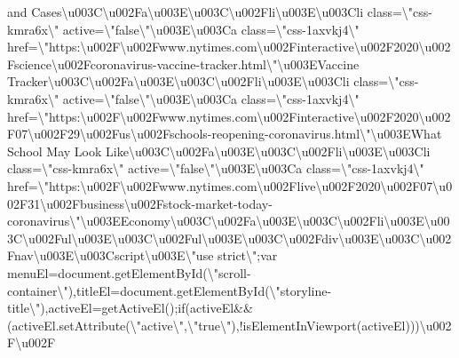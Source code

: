 and
Cases\textbackslash{}u003C\textbackslash{}u002Fa\textbackslash{}u003E\textbackslash{}u003C\textbackslash{}u002Fli\textbackslash{}u003E\textbackslash{}u003Cli
class=\textbackslash{}"css-kmra6x\textbackslash{}"
active=\textbackslash{}"false\textbackslash{}"\textbackslash{}u003E\textbackslash{}u003Ca
class=\textbackslash{}"css-1axvkj4\textbackslash{}"
href=\textbackslash{}"https:\textbackslash{}u002F\textbackslash{}u002Fwww.nytimes.com\textbackslash{}u002Finteractive\textbackslash{}u002F2020\textbackslash{}u002Fscience\textbackslash{}u002Fcoronavirus-vaccine-tracker.html\textbackslash{}"\textbackslash{}u003EVaccine
Tracker\textbackslash{}u003C\textbackslash{}u002Fa\textbackslash{}u003E\textbackslash{}u003C\textbackslash{}u002Fli\textbackslash{}u003E\textbackslash{}u003Cli
class=\textbackslash{}"css-kmra6x\textbackslash{}"
active=\textbackslash{}"false\textbackslash{}"\textbackslash{}u003E\textbackslash{}u003Ca
class=\textbackslash{}"css-1axvkj4\textbackslash{}"
href=\textbackslash{}"https:\textbackslash{}u002F\textbackslash{}u002Fwww.nytimes.com\textbackslash{}u002Finteractive\textbackslash{}u002F2020\textbackslash{}u002F07\textbackslash{}u002F29\textbackslash{}u002Fus\textbackslash{}u002Fschools-reopening-coronavirus.html\textbackslash{}"\textbackslash{}u003EWhat
School May Look
Like\textbackslash{}u003C\textbackslash{}u002Fa\textbackslash{}u003E\textbackslash{}u003C\textbackslash{}u002Fli\textbackslash{}u003E\textbackslash{}u003Cli
class=\textbackslash{}"css-kmra6x\textbackslash{}"
active=\textbackslash{}"false\textbackslash{}"\textbackslash{}u003E\textbackslash{}u003Ca
class=\textbackslash{}"css-1axvkj4\textbackslash{}"
href=\textbackslash{}"https:\textbackslash{}u002F\textbackslash{}u002Fwww.nytimes.com\textbackslash{}u002Flive\textbackslash{}u002F2020\textbackslash{}u002F07\textbackslash{}u002F31\textbackslash{}u002Fbusiness\textbackslash{}u002Fstock-market-today-coronavirus\textbackslash{}"\textbackslash{}u003EEconomy\textbackslash{}u003C\textbackslash{}u002Fa\textbackslash{}u003E\textbackslash{}u003C\textbackslash{}u002Fli\textbackslash{}u003E\textbackslash{}u003C\textbackslash{}u002Ful\textbackslash{}u003E\textbackslash{}u003C\textbackslash{}u002Ful\textbackslash{}u003E\textbackslash{}u003C\textbackslash{}u002Fdiv\textbackslash{}u003E\textbackslash{}u003C\textbackslash{}u002Fnav\textbackslash{}u003E\textbackslash{}u003Cscript\textbackslash{}u003E\textbackslash{}"use
strict\textbackslash{}";var
menuEl=document.getElementById(\textbackslash{}"scroll-container\textbackslash{}"),titleEl=document.getElementById(\textbackslash{}"storyline-title\textbackslash{}"),activeEl=getActiveEl();if(activeEl\&\&(activeEl.setAttribute(\textbackslash{}"active\textbackslash{}",\textbackslash{}"true\textbackslash{}"),!isElementInViewport(activeEl)))\textbackslash{}u002F\textbackslash{}u002F
